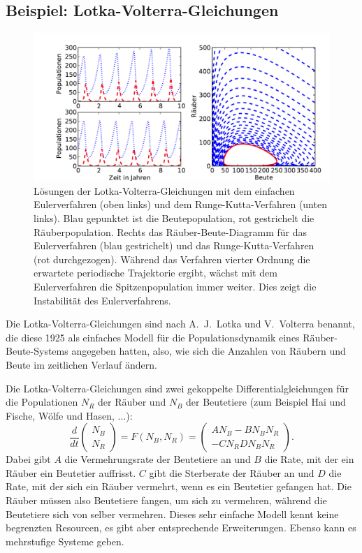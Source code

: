 \subsection{Beispiel: Lotka-Volterra-Gleichungen}

\begin{figure}
  \centering
  \includegraphics[width=\textwidth]{plots/lotka-volterra}
  \caption{Lösungen der Lotka-Volterra-Gleichungen mit dem einfachen
    Eulerverfahren (oben links) und dem Runge-Kutta-Verfahren (unten
    links). Blau gepunktet ist die Beutepopulation, rot gestrichelt
    die Räuberpopulation. Rechts das Räuber-Beute-Diagramm für das
    Eulerverfahren (blau gestrichelt) und das Runge-Kutta-Verfahren
    (rot durchgezogen). Während das Verfahren vierter Ordnung die
    erwartete periodische Trajektorie ergibt, wächst mit dem
    Eulerverfahren die Spitzenpopulation immer weiter. Dies zeigt die
    Instabilität des Eulerverfahrens.}
  \label{fig:lotka}
\end{figure}

Die Lotka-Volterra-Gleichungen sind nach A.~J.~Lotka und V.~Volterra
benannt, die diese 1925 als einfaches Modell für die
Populationsdynamik eines Räuber-Beute-Systems angegeben hatten, also,
wie sich die Anzahlen von Räubern und Beute im zeitlichen Verlauf
ändern.

Die Lotka-Volterra-Gleichungen sind zwei gekoppelte
Differentialgleichungen für die Populationen $N_R$ der Räuber und
$N_B$ der Beutetiere (zum Beispiel Hai und Fische, Wölfe und Hasen,
...):
\begin{equation}
  \label{eq:lotka-volterra}
  \frac{d}{dt}
  \begin{pmatrix}
    N_B\\
    N_R
  \end{pmatrix}
  = F(N_B, N_R) = 
  \begin{pmatrix}
    A N_B  - B N_BN_R\\
    -C N_R  D N_BN_R
  \end{pmatrix}.
\end{equation}
Dabei gibt $A$ die Vermehrungsrate der Beutetiere an und $B$ die Rate,
mit der ein Räuber ein Beutetier auffrisst. $C$ gibt die Sterberate
der Räuber an und $D$ die Rate, mit der sich ein Räuber vermehrt, wenn
es ein Beutetier gefangen hat. Die Räuber müssen also Beutetiere
fangen, um sich zu vermehren, während die Beutetiere sich von selber
vermehren. Dieses sehr einfache Modell kennt keine begrenzten
Resourcen, es gibt aber entsprechende Erweiterungen. Ebenso kann es
mehrstufige Systeme geben.

